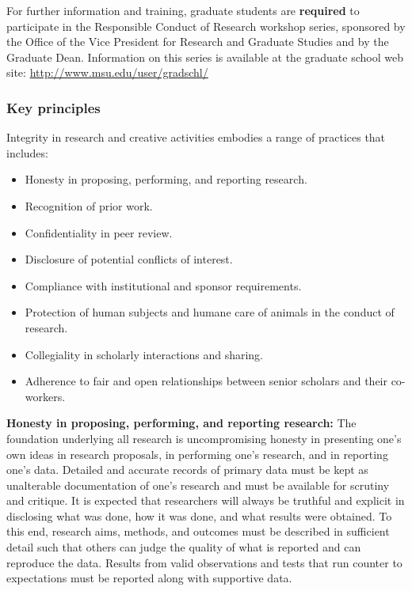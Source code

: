 For further information and training, graduate students are \textbf{required}
to participate in the Responsible Conduct of Research workshop series,
sponsored by the Office of the Vice President for Research and
Graduate Studies and by the Graduate Dean. Information on this series
is available at the graduate school web site:
\url{http://www.msu.edu/user/gradschl/}

\subsubsection{Key principles}

Integrity in research and creative activities embodies a range of practices that includes: 

\begin{itemize}
\item Honesty in proposing, performing, and reporting research. 

\item Recognition of prior work. 

\item Confidentiality in peer review. 

\item Disclosure of potential conflicts of interest. 

\item Compliance with institutional and sponsor requirements. 

\item Protection of human subjects and humane care of animals in the
  conduct of research. 

\item Collegiality in scholarly interactions and sharing.  

\item Adherence to fair and open relationships between senior
scholars and their co-workers. 

\end{itemize}

\textbf{Honesty in proposing, performing, and reporting research:} The
foundation underlying all research is uncompromising honesty in
presenting one’s own ideas in research proposals, in performing one’s
research, and in reporting one’s data. Detailed and accurate records
of primary data must be kept as unalterable documentation of one’s
research and must be available for scrutiny and critique. It is
expected that researchers will always be truthful and explicit in
disclosing what was done, how it was done, and what results were
obtained. To this end, research aims, methods, and outcomes must be
described in sufficient detail such that others can judge the quality
of what is reported and can reproduce the data. Results from valid
observations and tests that run counter to expectations must be
reported along with supportive data.
 
